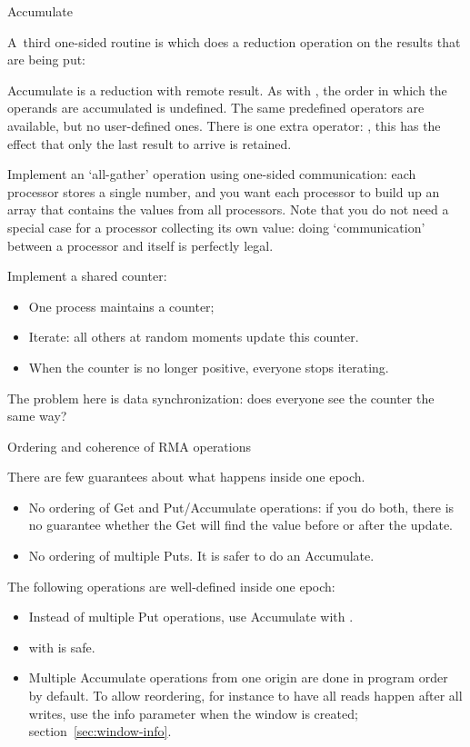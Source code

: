  {Accumulate}

A~third one-sided routine
is  which does a reduction operation on the results
that are being put:


Accumulate is a reduction with remote result. As with , the 
order in which the operands are accumulated is undefined. 
The same predefined operators are available, but no
user-defined ones. There is one extra operator: ,
this has the effect that only the last result to arrive is retained.

\begin{exercise}
  Implement an `all-gather' operation using one-sided communication:
  each processor stores a single number, and you want each processor
  to build up an array that contains the values from all
  processors. Note that you do not need a special case for a processor
  collecting its own value: doing `communication' between a processor
  and itself is perfectly legal.
\end{exercise}

\begin{exercise}
  \label{ex:countdown}

  Implement a shared counter:
  \begin{itemize}
  \item One process maintains a counter;
  \item Iterate: all others at random moments update this counter.
  \item When the counter is no longer positive, everyone stops iterating.
  \end{itemize}
  The problem here is data synchronization: does everyone see the
  counter the same way?
\end{exercise}

 {Ordering and coherence of RMA operations}

There are few guarantees about what happens inside one epoch.
\begin{itemize}
\item No ordering of Get and Put/Accumulate operations: if you do
  both, there is no guarantee whether the Get will find the value
  before or after the update.
\item No ordering of multiple Puts. It is safer to do an Accumulate.
\end{itemize}
The following operations are well-defined inside one epoch:
\begin{itemize}
\item Instead of multiple Put operations, use Accumulate with
  .
\item {} with
   is safe.
\item Multiple Accumulate operations from one origin are done in
  program order by default. To allow reordering, for instance to have
  all reads happen after all writes, use the info parameter
  when the window is created; section~\ref{sec:window-info}.
\end{itemize}

